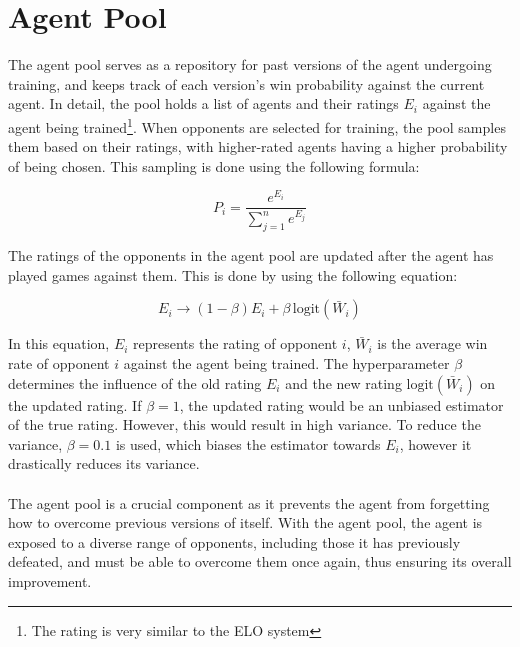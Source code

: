 \section{Agent Pool}
The agent pool serves as a repository for past versions of the agent undergoing training, and keeps track of each version's win probability against the current agent. In detail, the pool holds a list of agents and their ratings $E_i$ against the agent being trained\footnote{The rating is very similar to the ELO system}. When opponents are selected for training, the pool samples them based on their ratings, with higher-rated agents having a higher probability of being chosen. This sampling is done using the following formula:

\begin{equation}
    P_i = \frac{e^{E_i}}{\sum_{j=1}^n e^{E_j}}
    \label{eq:agent-pool-sampling}
\end{equation}

The ratings of the opponents in the agent pool are updated after the agent has played games against them. This is done by using the following equation:

\begin{equation}
    E_i \rightarrow (1-\beta) E_i + \beta \, \textrm{logit}(\bar W_i)
    \label{eq:agent-pool-rating-update}
\end{equation}

In this equation, $E_i$ represents the rating of opponent $i$, $\bar W_i$ is the average win rate of opponent $i$ against the agent being trained. The hyperparameter $\beta$ determines the influence of the old rating $E_i$ and the new rating $\textrm{logit}(\bar W_i)$ on the updated rating. If $\beta = 1$, the updated rating would be an unbiased estimator of the true rating. However, this would result in high variance. To reduce the variance, $\beta = 0.1$ is used, which biases the estimator towards $E_i$, however it drastically reduces its variance.\\\\
The agent pool is a crucial component as it prevents the agent from forgetting how to overcome previous versions of itself. With the agent pool, the agent is exposed to a diverse range of opponents, including those it has previously defeated, and must be able to overcome them once again, thus ensuring its overall improvement.

